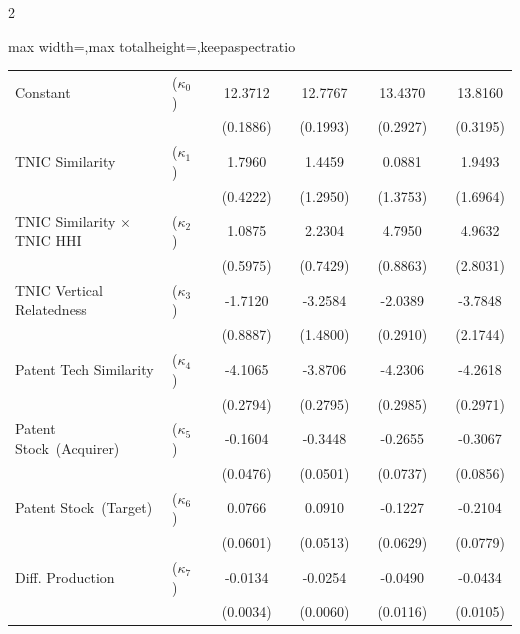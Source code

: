 \documentclass[12pt]{article}
\begin{document}
\begin{spacing}{2}
\begin{table}[tbp]
\begin{center}
\begin{adjustbox}{max width=\textwidth,max totalheight=\textheight,keepaspectratio}
\begin{threeparttable}
\begin{tabular}{llcccccccc}
Constant                 & ($\kappa_0$)  &  &     12.3712  &  &     12.7767  & &       13.4370  &  &      13.8160  \\ 
                             &               &    &   (0.1886) & &      (0.1993) & &       (0.2927) &   &     (0.3195) \\
    TNIC Similarity          & ($\kappa_1$)  &   &    1.7960   &  &     1.4459   &     &   0.0881   &     &   1.9493   \\
                             &               &    &   (0.4222) &     &  (1.2950) &    &   (1.3753) &       & (1.6964) \\
    TNIC Similarity $\times$ TNIC HHI & ($\kappa_2$) &    &  1.0875   &    &   2.2304   &    &    4.7950   &    &    4.9632   \\
                             &               &    &   (0.5975) &  &     (0.7429) &     &   (0.8863) &     &   (2.8031) \\
    TNIC Vertical Relatedness     & ($\kappa_3$)  &  &     -1.7120  &  &     -3.2584  &    &    -2.0389  &      &  -3.7848  \\
                             &               &    &   (0.8887) &   &    (1.4800) &     &   (0.2910) &     &   (2.1744) \\
    Patent Tech Similarity   & ($\kappa_4$)  &    &   -4.1065  &     &  -3.8706  &      &  -4.2306  &    &    -4.2618  \\
                             &               &     &  (0.2794) &   &    (0.2795) &  &      (0.2985) &    &    (0.2971)  \\
    Patent Stock~(Acquirer)  & ($\kappa_5$)  &    &   -0.1604  &    &   -0.3448  &   &     -0.2655  &    &    -0.3067   \\
                             &               &    &   (0.0476) &  &     (0.0501) &   &     (0.0737) &      &  (0.0856)  \\
    Patent Stock~(Target)    & ($\kappa_6$)  &   &    0.0766   &   &    0.0910   &   &     -0.1227  &    &    -0.2104   \\
                             &               &    &   (0.0601) &    &   (0.0513) &      &  (0.0629) &     &   (0.0779)  \\
    Diff. Production         & ($\kappa_7$)  &    &   -0.0134  &   &    -0.0254  &   &     -0.0490  &     &   -0.0434   \\
                             &               &   &    (0.0034) &    &   (0.0060) &   &     (0.0116) &      &  (0.0105)  \\

\end{tabular}
\end{threeparttable}
\end{adjustbox}
\end{center}
\end{table}
\end{spacing}
\end{document}
